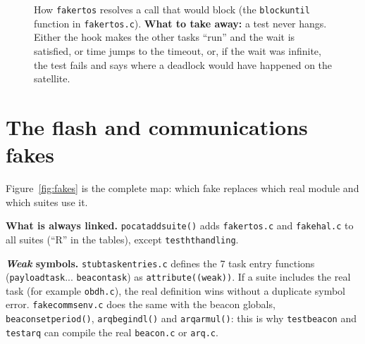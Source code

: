 \documentclass[11pt,a4paper]{article}
\DeclareRobustCommand{\_}{\textunderscore\allowbreak}
\newcommand{\cd}[1]{\texttt{#1}}
\begin{document}
\begin{figure}[p]
\caption{How \cd{fake\_rtos} resolves a call that would block (the \cd{block\_until} function in
\cd{fake\_rtos.c}). \textbf{What to take away:} a test never hangs. Either the hook makes the other tasks
``run'' and the wait is satisfied, or time jumps to the timeout, or, if the
wait was infinite, the test fails and says where a deadlock would have happened on the satellite.}
\label{fig:rtos}
\end{figure}

\clearpage
\section{The flash and communications fakes}\label{sec:fakes}

Figure~\ref{fig:fakes} is the complete map: which fake replaces which real module and
which suites use it.

\textbf{What is always linked.} \cd{pocat\_add\_suite()} adds \cd{fake\_rtos.c} and
\cd{fake\_hal.c} to all suites (``R'' in the tables), except \cd{test\_ht\_handling}.

\textbf{\emph{Weak} symbols.} \cd{stub\_task\_entries.c} defines the 7 task entry functions
(\cd{payload\_task}... \cd{beacon\_task}) as \cd{\_\_attribute\_\_((weak))}. If a
suite includes the real task (for example \cd{obdh.c}), the real definition wins without a
duplicate symbol error. \cd{fake\_comms\_env.c} does the same with the beacon globals,
\cd{beacon\_set\_period()}, \cd{arq\_begin\_dl()} and \cd{arq\_arm\_ul()}: this is why
\cd{test\_beacon} and \cd{test\_arq} can compile the real \cd{beacon.c} or \cd{arq.c}.
\end{document}
